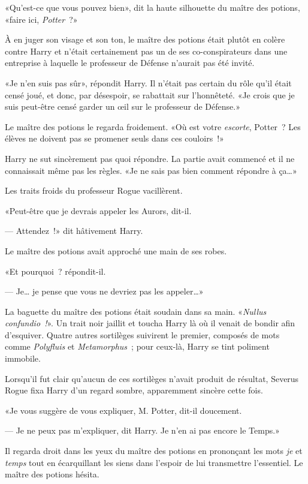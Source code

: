 «Qu'est-ce que vous pouvez bien», dit la haute silhouette du maître des potions, «faire ici, \emph{Potter}~?»

À en juger son visage et son ton, le maître des potions était plutôt en colère contre Harry et n'était certainement pas un de ses co-conspirateurs dans une entreprise à laquelle le professeur de Défense n'aurait pas été invité.

«Je n'en suis pas sûr», répondit Harry. Il n'était pas certain du rôle qu'il était censé joué, et donc, par désespoir, se rabattait sur l'honnêteté. «Je crois que je suis peut-être censé garder un œil sur le professeur de Défense.»

Le maître des potions le regarda froidement. «Où est votre \emph{escorte}, Potter~? Les élèves ne doivent pas se promener seuls dans ces couloirs~!»

Harry ne sut sincèrement pas quoi répondre. La partie avait commencé et il ne connaissait même pas les règles. «Je ne sais pas bien comment répondre à ça…»

Les traits froids du professeur Rogue vacillèrent.

«Peut-être que je devrais appeler les Aurors, dit-il.

--- Attendez~!» dit hâtivement Harry.

Le maître des potions avait approché une main de ses robes.

«Et pourquoi~? répondit-il.

--- Je… je pense que vous ne devriez pas les appeler…»

La baguette du maître des potions était soudain dans sa main. «\emph{Nullus confundio~!}». Un trait noir jaillit et toucha Harry là où il venait de bondir afin d'esquiver. Quatre autres sortilèges suivirent le premier, composés de mots comme \emph{Polyfluis} et \emph{Metamorphus}~; pour ceux-là, Harry se tint poliment immobile.

Lorsqu'il fut clair qu'aucun de ces sortilèges n'avait produit de résultat, Severus Rogue fixa Harry d'un regard sombre, apparemment sincère cette fois.

«Je vous suggère de vous expliquer, M. Potter, dit-il doucement.

--- Je ne peux pas m'expliquer, dit Harry. Je n'en ai pas encore le Temps.»

Il regarda droit dans les yeux du maître des potions en prononçant les mots \emph{je} et \emph{temps} tout en écarquillant les siens dans l'espoir de lui transmettre l'essentiel. Le maître des potions hésita.

